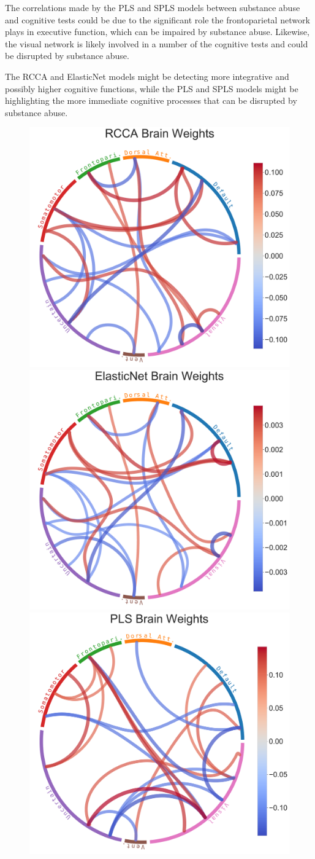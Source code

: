 The correlations made by the PLS and SPLS models between substance abuse and cognitive tests could be due to the significant role the frontoparietal network plays in executive function, which can be impaired by substance abuse.
Likewise, the visual network is likely involved in a number of the cognitive tests and could be disrupted by substance abuse.

The RCCA and ElasticNet models might be detecting more integrative and possibly higher cognitive functions, while the PLS and SPLS models might be highlighting the more immediate cognitive processes that can be disrupted by substance abuse.

\begin{figure}[h]
    \centering
    \includegraphics[width=0.49\linewidth]{figures/hcp/RCCA brain weights}
    \includegraphics[width=0.49\linewidth]{figures/hcp/ElasticNet brain weights}
    \includegraphics[width=0.49\linewidth]{figures/hcp/PLS brain weights}

\end{figure}
